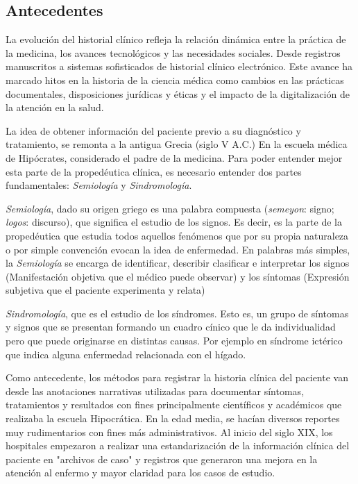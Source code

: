     \subsection{Antecedentes}
    La evolución del historial clínico refleja la relación dinámica entre la práctica de la medicina, los avances tecnológicos y las necesidades sociales. Desde registros manuscritos a sistemas sofisticados de historial clínico electrónico. Este avance ha marcado hitos en la historia de la ciencia médica como cambios en las prácticas documentales, disposiciones jurídicas y éticas y el impacto de la digitalización de la atención en la salud.

    La idea de obtener información del paciente previo a su diagnóstico y tratamiento, se remonta a la antigua Grecia (siglo V A.C.) En la escuela médica de Hipócrates, considerado el padre de la medicina. Para poder entender mejor esta parte de la propedéutica clínica, es necesario entender dos partes fundamentales: \textit{Semiología} y \textit{Sindromología}.
  
    \textit{Semiología}, dado su origen griego es una palabra compuesta (\textit{semeyon}: signo; \textit{logos}: discurso), que significa el estudio de los signos. Es decir, es la parte de la propedéutica que estudia todos aquellos fenómenos que por su propia naturaleza o por simple convención evocan la idea de enfermedad. En palabras más simples, la \textit{Semiología} se encarga de identificar, describir clasificar e interpretar los signos (Manifestación objetiva que el médico puede observar) y los síntomas (Expresión subjetiva que el paciente experimenta y relata)
    
    \textit{Sindromología}, que es el estudio de los síndromes. Esto es, un grupo de síntomas y signos que se presentan formando un cuadro cínico que le da individualidad pero que puede originarse en distintas causas. Por ejemplo en síndrome ictérico que indica alguna enfermedad relacionada con el hígado.

   Como antecedente, los métodos para registrar la historia clínica del paciente van desde las anotaciones narrativas utilizadas para documentar síntomas, tratamientos y resultados con fines principalmente científicos y académicos que realizaba la escuela Hipocrática. En la edad media, se hacían diversos reportes muy rudimentarios con fines más administrativos. Al inicio del siglo XIX, los hospitales empezaron a realizar una estandarización de la información clínica del paciente en "archivos de caso" y registros que generaron una mejora en la atención al enfermo y mayor claridad para los casos de estudio.


